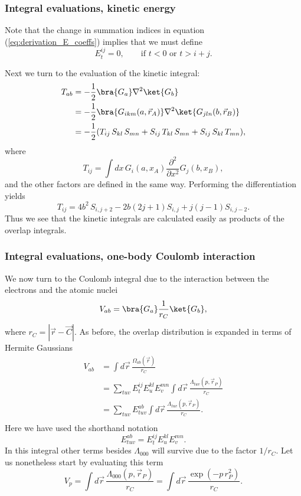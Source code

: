 \frame
{
  \frametitle{Integral evaluations, kinetic energy}
\begin{small}
{\scriptsize
Note that the change in summation indices in equation (\ref{eq:derivation_E_coeffs}) implies that we must define
\begin{equation}
 E^{ij}_t = 0, \qquad \text{if }t<0\text{ or }t > i + j.
\end{equation}

Next we turn to the evaluation of the kinetic integral:
\begin{equation}
\begin{split}
T_{ab} & = -\frac{1}{2}\bra{G_a}\nabla^2\ket{G_b} \\
       & = -\frac{1}{2}\bra{G_{ikm}(a, \vec r_A)}\nabla^2\ket{G_{jln}(b, \vec r_B)} \\
       & = -\frac{1}{2}(T_{ij}\,S_{kl}\,S_{mn} + S_{ij}\,T_{kl}\,S_{mn} + S_{ij}\,S_{kl}\,T_{mn}),
\end{split}
\end{equation}
where
\begin{equation}
 T_{ij} = \int dx \,G_i(a,x_A)\frac{\partial^2}{\partial x^2}G_j(b,x_B),
\end{equation}
and the other factors are defined in the same way. Performing the differentiation yields
\begin{equation}
 T_{ij} = 4b^2\,S_{i,j+2} - 2b(2j + 1)S_{i,j} + j(j-1)S_{i,j-2}.
\end{equation}
Thus we see that the kinetic integrals are calculated easily as products of the overlap integrals.
}
\end{small}
}
\frame
{
  \frametitle{Integral evaluations, one-body Coulomb interaction}
\begin{small}
{\scriptsize
We now turn to the Coulomb integral due to the interaction between the electrons and the atomic nuclei
\begin{equation}
 V_{ab} = \bra{G_a}\frac{1}{r_C}\ket{G_b},
\end{equation}
where $r_C = |\vec r - \vec C|$. As before, the overlap distribution is expanded in terms of  Hermite Gaussians
\begin{equation}
\begin{split}
 V_{ab} & = \int d\vec r \,\frac{\Omega_{ab}(\vec r)}{r_C} \\
        & = \sum_{tuv}E^{ij}_t E^{kl}_u E^{mn}_v\int d\vec r \, \frac{\Lambda_{tuv}(p,\vec r_P)}{r_C} \\
        & = \sum_{tuv}E^{ab}_{tuv}\int d\vec r \, \frac{\Lambda_{tuv}(p,\vec r_P)}{r_C}. \\
\end{split}
\end{equation}
Here we have used the shorthand notation
\begin{equation}
 E^{ab}_{tuv} = E^{ij}_t E^{kl}_u E^{mn}_v.
\end{equation}
In this integral other terms besides $\Lambda_{000}$ will survive due to the factor $1/r_C$. Let us nonetheless start by evaluating this term
\begin{equation}
 V_p = \int d\vec r \, \frac{\Lambda_{000}(p,\vec r_P)}{r_C} = \int d\vec r\, \frac{\exp(-p\,r_P^2)}{r_C}.
\end{equation}
}
\end{small}
}
